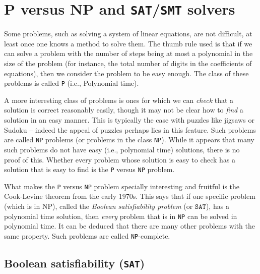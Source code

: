 \documentclass{amsart}
\theoremstyle{plain}
\theoremstyle{definition}
\theoremstyle{remark}
\begin{document}
\hypertarget{p-versus-np-and-satsmt-solvers}{%
	\section{P versus NP and \texttt{SAT}/\texttt{SMT}
	  solvers}\label{p-versus-np-and-satsmt-solvers}}

Some problems, such as solving a system of linear equations, are not
difficult, at least once one knows a method to solve them. The thumb
rule used is that if we can solve a problem with the number of steps
being at most a polynomial in the size of the problem (for instance, the
total number of digits in the coefficients of equations), then we
consider the problem to be easy enough. The class of these problems is
called \texttt{P} (i.e., Polynomial time).

A more interesting class of problems is ones for which we can
\emph{check} that a solution is correct reasonably easily, though it may
not be clear how to \emph{find} a solution in an easy manner. This is
typically the case with puzzles like jigsaws or Sudoku -- indeed the
appeal of puzzles perhaps lies in this feature. Such problems are called
\texttt{NP} problems (or problems in the class \texttt{NP}). While it appears that
many such problems do not have easy (i.e., polynomial time) solutions,
there is no proof of this. Whether every problem whose solution is easy
to check has a solution that is easy to find is the \texttt{P} versus \texttt{NP}
problem.

What makes the \texttt{P} versus \texttt{NP} problem specially interesting and fruitful is the
Cook-Levine theorem from the early 1970s. This says that if one specific
problem (which is in NP), called the \emph{Boolean satisfiability problem} (or
\(\texttt{SAT}\)), has a polynomial time solution, then \emph{every} problem that
is in \texttt{NP} can be solved in polynomial time. It can be deduced that
there are many other problems with the same property. Such problems are
called \texttt{NP}-complete.

\subsection{Boolean satisfiability (\texttt{SAT})}
\end{document}
